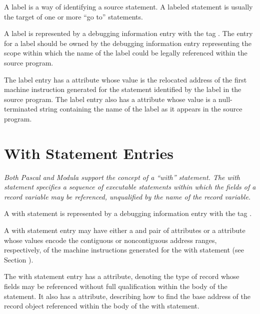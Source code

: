 A label is a way of identifying a source statement. A labeled
statement is usually the target of one or more ``go to''
statements.

A label is represented by a debugging information entry with
the 
tag . 
The entry for a label should be owned by
the debugging information entry representing the scope within
which the name of the label could be legally referenced within
the source program.

The label entry has a  attribute whose value
is the relocated address of the first machine instruction
generated for the statement identified by the label in
the source program.  The label entry also has a 
attribute whose value is a null-terminated string containing
the name of the label as it appears in the source program.


\section{With Statement Entries}
\label{chap:withstatemententries}

\textit{Both Pascal and Modula support the concept of a ``with''
statement. The with statement specifies a sequence of
executable statements within which the fields of a record
variable may be referenced, unqualified by the name of the
record variable.}

A with statement is represented by a debugging information
entry with the tag .

A with statement entry may have either a  and
 pair of attributes or a  attribute
whose values encode the contiguous or non\dash contiguous address
ranges, respectively, of the machine instructions generated
for the with statement 
(see Section ).

The with statement entry has a  attribute, denoting
the type of record whose fields may be referenced without full
qualification within the body of the statement. It also has
a  attribute, describing how to find the base
address of the record object referenced within the body of
the with statement.

